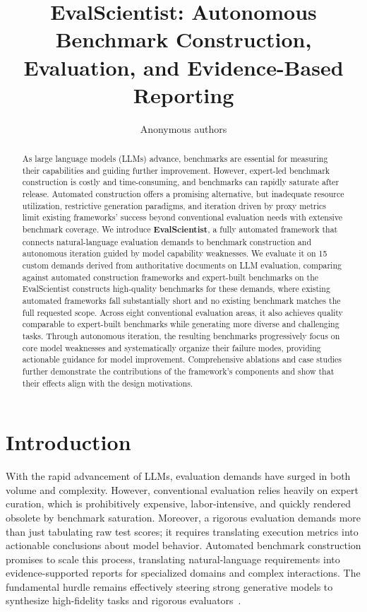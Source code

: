 \documentclass{article} %
\title{EvalScientist: Autonomous Benchmark Construction, Evaluation, and Evidence-Based Reporting}
\author{Anonymous authors}
\begin{document}
	
	
	\maketitle
	
\begin{abstract}
		As large language models (LLMs) advance, benchmarks are essential for
		measuring their capabilities and guiding further improvement. However,
		expert-led benchmark construction is costly and time-consuming, and benchmarks
		can rapidly saturate after release. Automated construction offers a promising
		alternative, but inadequate resource utilization, restrictive generation
		paradigms, and iteration driven by proxy metrics limit existing frameworks'
		success beyond conventional evaluation needs with extensive benchmark coverage.
		We introduce \textbf{EvalScientist}, a fully automated framework that connects
		natural-language evaluation demands to benchmark construction and autonomous
		iteration guided by model capability weaknesses. We evaluate it on 15 custom
		demands derived from authoritative documents on LLM evaluation, comparing
		against automated construction frameworks and expert-built benchmarks on the
		EvalScientist constructs high-quality benchmarks
		for these demands, where existing automated frameworks fall substantially short
		and no existing benchmark matches the full requested scope. Across eight
		conventional evaluation areas, it also achieves quality comparable to
		expert-built benchmarks while generating more diverse and challenging tasks.
		Through autonomous iteration, the resulting benchmarks progressively focus on
		core model weaknesses and systematically organize their failure modes,
		providing actionable guidance for model improvement. Comprehensive ablations
		and case studies further demonstrate the contributions of the framework's
		components and show that their effects align with the design motivations.
	\end{abstract}
	
	\section{Introduction}\label{sec:intro}
	With the rapid advancement of LLMs, evaluation demands have surged in both volume and complexity. However, conventional evaluation relies heavily on expert curation, which is prohibitively expensive, labor-intensive, and quickly rendered obsolete by benchmark saturation. Moreover, a rigorous evaluation demands more than just tabulating raw test scores; it requires translating execution metrics into actionable conclusions about model behavior. Automated benchmark construction promises to scale this process, translating natural-language requirements into evidence-supported reports for specialized domains and complex interactions. The fundamental hurdle remains effectively steering strong generative models to synthesize high-fidelity tasks and rigorous evaluators~\citep{benchagents2025,benchbench2026}.
\end{document}
